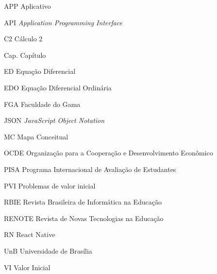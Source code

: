 \begin{siglas}
  \item[APP] Aplicativo
  \item[API] \textit{Application Programming Interface}
  \item[C2] Cálculo 2
  \item[Cap.] Capítulo
  \item[ED] Equação Diferencial
  \item[EDO] Equação Diferencial Ordinária
  \item[FGA] Faculdade do Gama
  \item[JSON] \textit{JavaScript Object Notation}
  \item[MC] Mapa Conceitual
  \item[OCDE] Organização para a Cooperação e Desenvolvimento Econômico
  \item[PISA] Programa Internacional de Avaliação de Estudantes
  \item[PVI] Problemas de valor inicial
  \item[RBIE] Revista Brasileira de Informática na Educação
  \item[RENOTE] Revista de Novas Tecnologias na Educação
  \item[RN] React Native
  \item[UnB] Universidade de Brasília
  \item[VI] Valor Inicial
\end{siglas}
